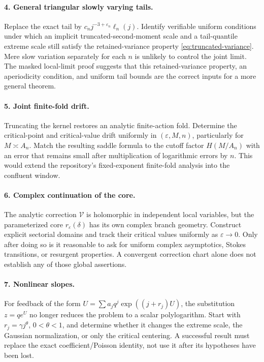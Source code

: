 \documentclass[11pt,a4paper]{article}
\numberwithin{equation}{section}
\theoremstyle{definition}
\theoremstyle{remark}
\newcommand{\eps}{\varepsilon}
\newcommand{\cV}{\mathcal V}
\begin{document}
\paragraph{4. General triangular slowly varying tails.}
Replace the exact tail by
\(c_nj^{-3+\eps_n}\ell_n(j)\). Identify verifiable uniform conditions under
which an implicit truncated-second-moment scale and a tail-quantile extreme
scale still satisfy the retained-variance property
\eqref{eq:truncated-variance}. Mere slow variation separately for each \(n\)
is unlikely to control the joint limit. The masked local-limit proof suggests
that this retained-variance property, an aperiodicity condition, and uniform
tail bounds are the correct inputs for a more general theorem.

\paragraph{5. Joint finite-fold drift.}
Truncating the kernel restores an analytic finite-action fold. Determine the
critical-point and critical-value drift uniformly in
\((\eps,M,n)\), particularly for \(M\asymp A_n\). Match the resulting
saddle formula to the cutoff factor \(H(M/A_n)\) with an error that remains
small after multiplication of logarithmic errors by \(n\). This would extend
the repository's fixed-exponent finite-fold analysis into the confluent window.

\paragraph{6. Complex continuation of the core.}
The analytic correction \(\cV\) is holomorphic in independent local
variables, but the parameterized core \(r_\eps(\delta)\) has its own complex
branch geometry. Construct explicit sectorial domains and track their
critical values uniformly as \(\eps\to0\). Only after doing so is it
reasonable to ask for uniform complex asymptotics, Stokes transitions, or
resurgent properties. A convergent correction chart alone does not establish
any of those global assertions.

\paragraph{7. Nonlinear slopes.}
For feedback of the form
\(U=\sum a_jq^j\exp((j+r_j)U)\), the substitution \(z=qe^U\) no longer
reduces the problem to a scalar polylogarithm. Start with
\(r_j=\gamma j^\theta\), \(0<\theta<1\), and determine whether it changes
the extreme scale, the Gaussian normalization, or only the critical centering.
A successful result must replace the exact coefficient/Poisson identity, not
use it after its hypotheses have been lost.
\end{document}

